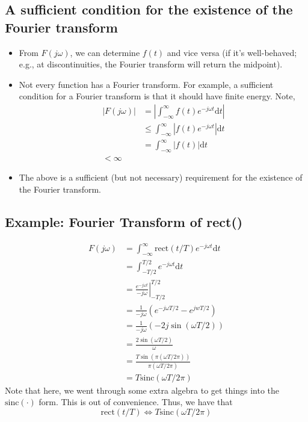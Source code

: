 \documentclass[10pt]{article}
\newcommand{\sinc}{\text{sinc}}
\begin{document}
\subsection*{A sufficient condition for the existence of the Fourier transform}
    \begin{itemize}
        \item From $F(j\omega)$, we can determine $f(t)$ and vice versa (if it's well-behaved; e.g., at discontinuities, the Fourier transform will return the midpoint).
        \item Not every function has a Fourier transform.  For example, a sufficient condition for a Fourier transform is that it should have finite energy.  Note,
        \begin{align*}
            |F(j\omega)| &= \left|\int_{-\infty}^\infty f(t) e^{-j\omega t} \text{d}t\right|\\
            &\leq \int_{-\infty}^\infty \left| f(t) e^{-j\omega t} \right| \text{d}t\\
            &= \int_{-\infty}^\infty|f(t)| \text{d}t\\
            < \infty
        \end{align*}
        \item The above is a sufficient (but not necessary) requirement for the existence of the Fourier transform.
    \end{itemize}

\subsection*{Example: Fourier Transform of rect()}
\begin{align*}
    F(j\omega) &= \int_{-\infty}^\infty \text{rect}(t/T) e^{-j\omega t} \text{d}t\\
    &= \int_{-T/2}^{T/2} e^{-j\omega t} \text{d}t\\
    &= \left.\frac{e^{-j\omega t}}{-j\omega}\right|_{-T/2}^{T/2}\\
    &= \frac{1}{-j\omega} \left(e^{-j\omega T/2} - e^{jwT/2}\right)\\
    &= \frac{1}{-j\omega}(-2j \sin(\omega T/2))\\
    &= \frac{2\sin(\omega T/2)}{\omega}\\
    &= \frac{T \sin(\pi(\omega T/2\pi))}{\pi(\omega T/2\pi)}\\
    &= T \sinc(\omega T / 2\pi)
\end{align*}
Note that here, we went through some extra algebra to get things into the $\sinc(\cdot)$ form.  This is out of convenience.  Thus, we have that
\[\text{rect}(t/T) \Longleftrightarrow T \sinc(\omega T/2\pi)\]
\end{document}
